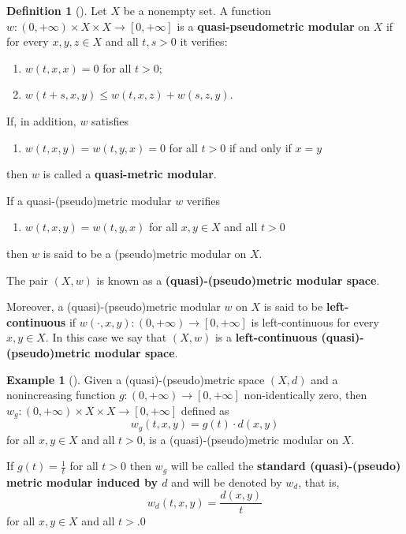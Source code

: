 \documentclass[11pt,a4paper]{amsart}
\theoremstyle{definition}
\newtheorem{definition}[theorem]{Definition}
\newtheorem{example}[theorem]{Example}
\begin{document}
	\begin{definition}[\cite{Chis15,SebogodiPhD}]\label{def:qpmm}
		Let $X$ be a nonempty set. A function $w:(0,+\infty)\times X\times X\to[0,+\infty]$ is  a \textbf{quasi-pseudometric modular} on $X$ if for every $x,y,z\in X$ and all $t,s>0$ it verifies:
		\begin{enumerate}[(M1)]
			\item\label{modular nondegenerate} $w(t,x,x)=0$ for all  $t>0;$
			\item\label{modular triangular} $w(t+s,x,y)\leq w(t,x,z)+w(s,z,y)$.
		\end{enumerate}
		
		\noindent If, in addition, $w$ satisfies
		\begin{enumerate}
			\item[(M3)] $w(t,x,y)=w(t,y,x)=0$ for all $t>0$ if and only if $x=y$
		\end{enumerate}
		then $w$ is called a \textbf{quasi-metric modular}.
		
		\noindent If a quasi-(pseudo)metric modular $w$ verifies
		\begin{enumerate}
			\item[(M4)] $w(t,x,y)=w(t,y,x)$ for all $x,y\in X$ and all $t>0$
		\end{enumerate}
		then $w$ is said to be a (pseudo)metric modular on $X.$
		
		
		The pair $(X,w)$ is known as a \textbf{(quasi)-(pseudo)metric modular space}.
		
		
		Moreover, a
		(quasi)-(pseudo)metric modular $w$ on $X$ is said to be \textbf{left-continuous} if $w(\cdot,x,y):(0,+\infty)\to[0,+\infty]$ is left-continuous for every $x,y\in X.$ In this case we say that $(X,w)$ is a \textbf{left-continuous (quasi)-(pseudo)metric modular space}.
		
		
	\end{definition}
	
	
	
	\begin{example}[\cite{Chis15}]\label{ex: canonical modular}
		Given a (quasi)-(pseudo)metric space $(X,d)$ and a nonincreasing function $g:(0,+\infty)\to [0,+\infty]$ non-identically zero,  then $w_g:(0,+\infty)\times X\times X\to[0,+\infty]$ defined as
		$$w_g(t,x,y)=g(t)\cdot d(x,y)$$
		for all $x,y\in X$ and all $t>0$, is a (quasi)-(pseudo)metric modular on $X.$
		
		If $g(t)=\tfrac{1}{t}$ for all $t>0$ then $w_g$ will be called the \textbf{standard (quasi)-(pseudo) metric modular induced by $d$} and will be denoted by $w_d$, that is,
		$$w_d(t,x,y)=\frac{d(x,y)}{t}$$
		for all $x,y\in X$ and all $t>.0$
		
	\end{example}
	
\end{document}

